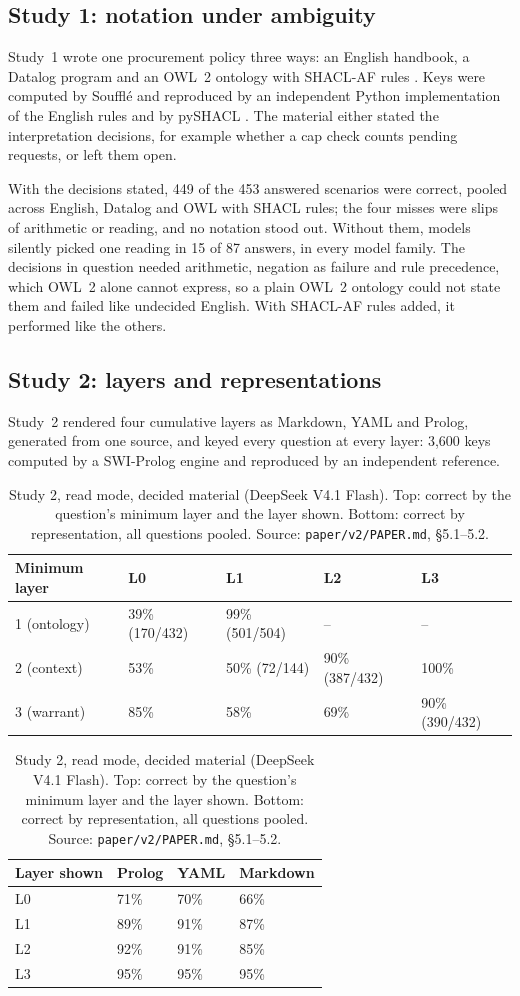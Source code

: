 \documentclass[11pt]{article}
\newcommand{\repo}[1]{\texttt{#1}}
\begin{document}
\subsection{Study 1: notation under ambiguity}

Study~1 wrote one procurement policy three ways: an English handbook, a Datalog program and an OWL~2 ontology
\citep{owl2} with SHACL-AF rules \citep{shacl,shaclaf}. Keys were computed by Souffl\'e \citep{jordan2016souffle}
and reproduced by an independent Python implementation of the English rules and by pySHACL \citep{pyshacl}. The
material either stated the interpretation decisions, for example whether a cap check counts pending requests, or
left them open.

With the decisions stated, 449 of the 453 answered scenarios were correct, pooled across English, Datalog and OWL
with SHACL rules; the four misses were slips of arithmetic or reading, and no notation stood out. Without them,
models silently picked one reading in 15 of 87 answers, in every model family. The decisions in question needed
arithmetic, negation as failure and rule precedence, which OWL~2 alone cannot express, so a plain OWL~2 ontology
could not state them and failed like undecided English. With SHACL-AF rules added, it performed like the others.

\subsection{Study 2: layers and representations}

Study~2 rendered four cumulative layers as Markdown, YAML and Prolog, generated from one source, and keyed every
question at every layer: 3,600 keys computed by a SWI-Prolog engine \citep{wielemaker2012swi} and reproduced by an
independent reference.

\begin{table}[t]
\centering\small
\caption{Study 2, read mode, decided material (DeepSeek V4.1 Flash). Top: correct by the question's minimum layer
and the layer shown. Bottom: correct by representation, all questions pooled. Source: \repo{paper/v2/PAPER.md},
\S5.1--5.2.}
\label{tab:v2}
\begin{tabular}{lllll}
\toprule
Minimum layer & L0 & L1 & L2 & L3\\
\midrule
1 (ontology) & 39\% (170/432) & 99\% (501/504) & -- & --\\
2 (context) & 53\% & 50\% (72/144) & 90\% (387/432) & 100\%\\
3 (warrant) & 85\% & 58\% & 69\% & 90\% (390/432)\\
\bottomrule
\end{tabular}

\medskip
\begin{tabular}{llll}
\toprule
Layer shown & Prolog & YAML & Markdown\\
\midrule
L0 & 71\% & 70\% & 66\%\\
L1 & 89\% & 91\% & 87\%\\
L2 & 92\% & 91\% & 85\%\\
L3 & 95\% & 95\% & 95\%\\
\bottomrule
\end{tabular}
\end{table}
\end{document}
